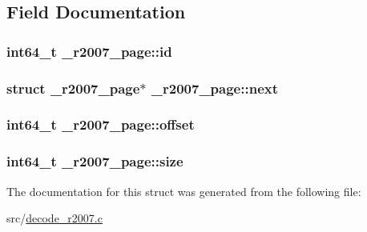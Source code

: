 \subsection{\-Field \-Documentation}
\hypertarget{struct__r2007__page_a8a17199a674100b664893fe190f69554}{
\subsubsection[{id}]{\setlength{\rightskip}{0pt plus 5cm}int64\-\_\-t {\bf \-\_\-r2007\-\_\-page\-::id}}}\label{struct__r2007__page_a8a17199a674100b664893fe190f69554}
\hypertarget{struct__r2007__page_ab5dd34a5df1ffc2ea2db5d281312fd3d}{
\subsubsection[{next}]{\setlength{\rightskip}{0pt plus 5cm}struct {\bf \-\_\-r2007\-\_\-page}$\ast$ {\bf \-\_\-r2007\-\_\-page\-::next}}}\label{struct__r2007__page_ab5dd34a5df1ffc2ea2db5d281312fd3d}
\hypertarget{struct__r2007__page_ab29c99b73dd36f063e7cc630a62d2078}{
\subsubsection[{offset}]{\setlength{\rightskip}{0pt plus 5cm}int64\-\_\-t {\bf \-\_\-r2007\-\_\-page\-::offset}}}\label{struct__r2007__page_ab29c99b73dd36f063e7cc630a62d2078}
\hypertarget{struct__r2007__page_a0d6f5378af94634631a93e9b88c3d471}{
\subsubsection[{size}]{\setlength{\rightskip}{0pt plus 5cm}int64\-\_\-t {\bf \-\_\-r2007\-\_\-page\-::size}}}\label{struct__r2007__page_a0d6f5378af94634631a93e9b88c3d471}


\-The documentation for this struct was generated from the following file\-:\begin{DoxyCompactItemize}
\item 
src/\hyperlink{decode__r2007_8c}{decode\-\_\-r2007.\-c}\end{DoxyCompactItemize}
